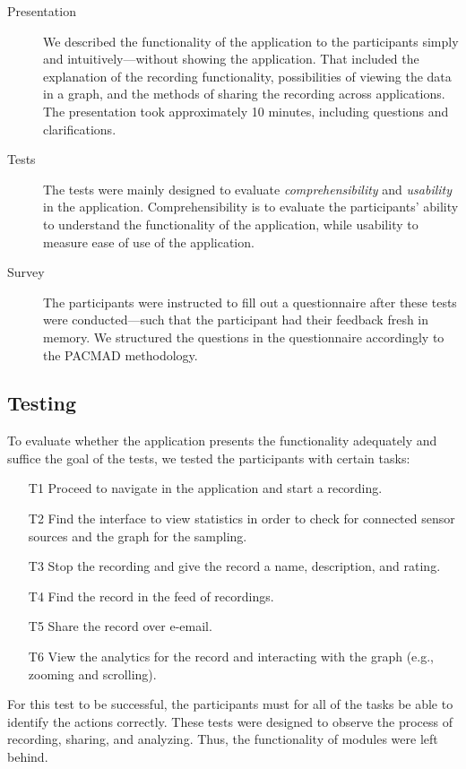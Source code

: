 \begin{description}
    \item[Presentation] We described the functionality of the application to the participants simply and intuitively---without showing the application. That included the explanation of the recording functionality, possibilities of viewing the data in a graph, and the methods of sharing the recording across applications. The presentation took approximately 10 minutes, including questions and clarifications.  
    \item[Tests] The tests were mainly designed to evaluate \textit{comprehensibility} and \textit{usability} in the application. Comprehensibility is to evaluate the participants' ability to understand the functionality of the application, while usability to measure ease of use of the application.
    \item[Survey] The participants were instructed to fill out a questionnaire after these tests were conducted---such that the participant had their feedback fresh in memory. We structured the questions in the questionnaire accordingly to the PACMAD methodology. 
\end{description}

\subsection{Testing}
To evaluate whether the application presents the functionality adequately and suffice the goal of the tests, we tested the participants with certain tasks:
\begin{itemize}
    \item[T1] Proceed to navigate in the application and start a recording.
    \item[T2] Find the interface to view statistics in order to check for connected sensor sources and the graph for the sampling.
    \item[T3] Stop the recording and give the record a name, description, and rating.
    \item[T4] Find the record in the feed of recordings. 
    \item[T5] Share the record over e-email.
    \item[T6] View the analytics for the record and interacting with the graph (e.g., zooming and scrolling). 
\end{itemize}

For this test to be successful, the participants must for all of the tasks be able to identify the actions correctly. These tests were designed to observe the process of recording, sharing, and analyzing. Thus, the functionality of modules were left behind. 


